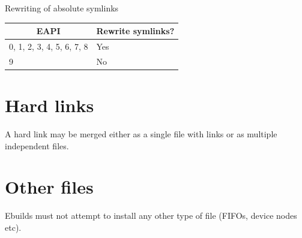 \begin{centertable}{Rewriting of absolute symlinks}
    \label{tab:symlink-rewrite}
    \begin{tabular}{ll}
      \toprule
      \multicolumn{1}{c}{\textbf{EAPI}} &
      \multicolumn{1}{c}{\textbf{Rewrite symlinks?}} \\
      \midrule
      0, 1, 2, 3, 4, 5, 6, 7, 8 & Yes \\
      9                         & No  \\
      \bottomrule
    \end{tabular}
\end{centertable}

\section{Hard links}

A hard link may be merged either as a single file with links or as multiple independent files.

\section{Other files}

Ebuilds must not attempt to install any other type of file (FIFOs, device nodes etc).


